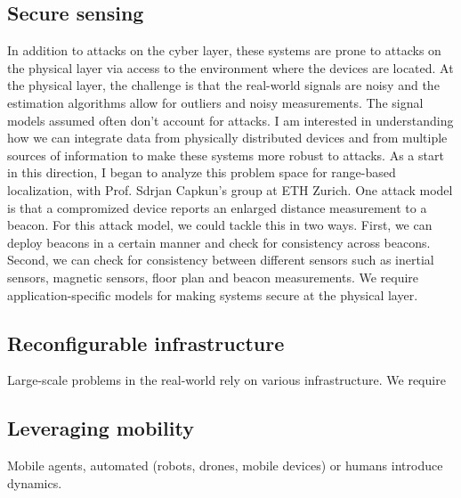 \documentclass[10pt]{article}
\begin{document}
\subsection{Secure sensing}
In addition to attacks on the cyber layer, these systems are prone to attacks on the physical layer via access to the environment where the devices are located. %
 At the physical layer, the challenge is that the real-world signals are noisy and the estimation algorithms allow for outliers and noisy measurements. The signal models assumed often don't account for attacks. I am interested in understanding how we can integrate data from physically distributed devices and from multiple sources of information to make these systems more robust to attacks. As a start in this direction, I began to analyze this problem space for range-based localization, with Prof. Sdrjan Capkun's group at ETH Zurich. One attack model is that a compromized device reports an enlarged distance measurement to a beacon. For this attack model, we could tackle this in two ways. First, we can deploy beacons in a certain manner and check for consistency across beacons. Second, we can check for consistency between different sensors such as inertial sensors, magnetic sensors, floor plan and beacon measurements. We require application-specific models for making systems secure at the physical layer.%

 
\subsection{Reconfigurable infrastructure}
Large-scale problems in the real-world rely on various infrastructure. We require    


\subsection{Leveraging mobility }
Mobile agents, automated (robots, drones, mobile devices) or humans introduce dynamics.   
\end{document}
